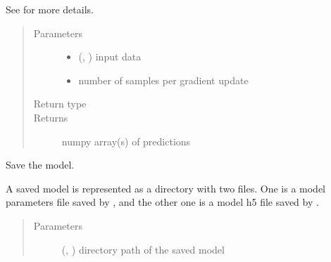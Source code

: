 \documentclass[letterpaper,10pt,english]{sphinxmanual}
\begin{document}
\begin{fulllineitems}
\begin{fulllineitems}
See  for more details.
\begin{quote}\begin{description}
\item[{Parameters}] \leavevmode\begin{itemize}
\item {} 
 (\sphinxcode{\sphinxupquote{Union}}{[}, \sphinxcode{\sphinxupquote{List}}{[}\sphinxcode{\sphinxupquote{ndarray}}{]}{]}) \textendash{} input data

\item {} 
 \textendash{} number of samples per gradient update

\end{itemize}

\item[{Return type}] \leavevmode
{}

\item[{Returns}] \leavevmode
numpy array(s) of predictions

\end{description}\end{quote}

\end{fulllineitems}


\begin{fulllineitems}
\label{\detokenize{matchzoo.engine:matchzoo.engine.base_model.BaseModel.save}}
Save the model.

A saved model is represented as a directory with two files. One is a
model parameters file saved by , and the other one is a model
h5 file saved by .
\begin{quote}\begin{description}
\item[{Parameters}] \leavevmode
{} (\sphinxcode{\sphinxupquote{Union}}{[}, \sphinxcode{\sphinxupquote{Path}}{]}) \textendash{} directory path of the saved model

\end{description}\end{quote}

\end{fulllineitems}


\end{fulllineitems}
\end{document}
